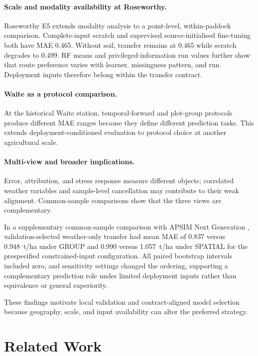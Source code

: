 \documentclass[runningheads]{venue/lncs/llncs}
\begin{document}
\paragraph{Scale and modality availability at Roseworthy.}
Roseworthy E5 extends modality analysis to a point-level, within-paddock comparison. Complete-input scratch and supervised source-initialised fine-tuning both have MAE 0.465. Without soil, transfer remains at 0.465 while scratch degrades to 0.499. RF means and privileged-information run values further show that route preference varies with learner, missingness pattern, and run. Deployment inputs therefore belong within the transfer contract.

\paragraph{Waite as a protocol comparison.}
At the historical Waite station, temporal-forward and plot-group protocols produce different MAE ranges because they define different prediction tasks. This extends deployment-conditioned evaluation to protocol choice at another agricultural scale.

\paragraph{Multi-view and broader implications.}
Error, attribution, and stress response measure different objects; correlated weather variables and sample-level cancellation may contribute to their weak alignment. Common-sample comparisons show that the three views are complementary.

In a supplementary common-sample comparison with APSIM Next Generation \cite{Holzworth2018APSIMNextGen}, validation-selected weather-only transfer had mean MAE of 0.837 versus 0.948~t/ha under GROUP and 0.990 versus 1.057~t/ha under SPATIAL for the prespecified constrained-input configuration. All paired bootstrap intervals included zero, and sensitivity settings changed the ordering, supporting a complementary prediction role under limited deployment inputs rather than equivalence or general superiority.

These findings motivate local validation and contract-aligned model selection because geography, scale, and input availability can alter the preferred strategy.

\section{Related Work}
\end{document}

